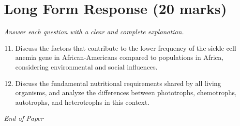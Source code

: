 \documentclass[12pt]{article}
\begin{document}
\section*{Long Form Response (20 marks)}
\textit{Answer each question with a clear and complete explanation.}
\begin{enumerate}[label=\arabic*.]
\setcounter{enumi}{10}
\item Discuss the factors that contribute to the lower frequency of the sickle-cell anemia gene in African-Americans compared to populations in Africa, considering environmental and social influences.
\item Discuss the fundamental nutritional requirements shared by all living organisms, and analyze the differences between phototrophs, chemotrophs, autotrophs, and heterotrophs in this context.
\end{enumerate}

\vfill
\noindent\textit{End of Paper}
\end{document}
